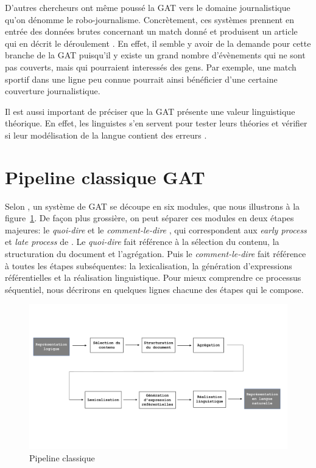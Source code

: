 D'autres chercheurs ont même poussé la \ac{GAT} vers le domaine journalistique qu'on dénomme le robo-journalisme. Concrètement, ces systèmes prennent en entrée des données brutes concernant un match donné et produisent un article qui en décrit le déroulement \citep{W17-3513}. En effet, il semble y avoir de la demande pour cette branche de la \ac{GAT} puisqu'il y existe un grand nombre d'évènements qui ne sont pas couverts, mais qui pourraient interessés des gens. Par exemple, une match sportif dans une ligne peu connue pourrait ainsi bénéficier d'une certaine couverture journalistique. 

Il est aussi important de préciser que la \ac{GAT} présente une valeur linguistique théorique. En effet, les linguistes s'en servent pour tester leurs théories et vérifier si leur modélisation de la langue contient des erreurs \citep{DanlosPresentationmodelegeneration1983}. 


\section{Pipeline classique GAT} \label{ppc}

Selon \cite{ReiterBuildingNaturalLanguage2000}, un système de \ac{GAT} se découpe en six modules, que nous illustrons à la figure~\ref{fig:Pipeline}. De façon plus grossière, on peut séparer ces modules en deux étapes majeures: le \emph{quoi-dire} et le \emph{comment-le-dire} \citep{DanlosPresentationmodelegeneration1983}, qui correspondent aux \emph{early process} et \emph{late process} de \cite{gatt18}. Le \emph{quoi-dire} fait référence à la sélection du contenu, la structuration du document et l'agrégation. Puis le \emph{comment-le-dire} fait référence à toutes les étapes subséquentes: la lexicalisation, la génération d'expressions référentielles et la réalisation linguistique. Pour mieux comprendre ce processus séquentiel, nous décrirons en quelques lignes chacune des étapes qui le compose.

\begin{figure}[htb] %
	\centering
	\includegraphics[width=1\textwidth, trim = {0cm 0cm 0cm 0cm},clip]{ch2/figs/pipeline.pdf}
	\caption{Pipeline classique}
	\label{fig:Pipeline}
\end{figure}

